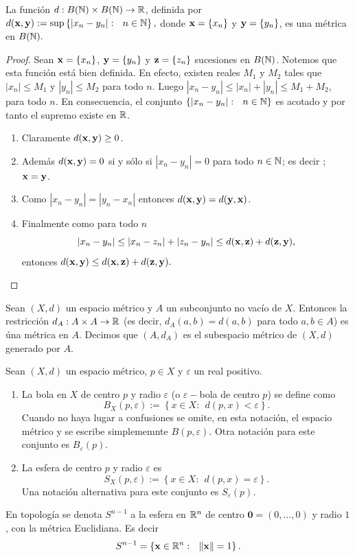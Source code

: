 \begin{example}
La función $d:B(\mathbb{N})\times B(\mathbb{N}) \to \mathbb{R}$, definida por $d(\mathbf{x} , \mathbf{y}):=\sup\left\{ |x_n-y_n|: \ \ n\in \mathbb{N} \right\},$ donde $\mathbf{x}=\left\{x_n \right\}$ y $\mathbf{y}=\left\{y_n \right\}$, es una métrica en $B(\mathbb{N}).$
\end{example}
\begin{proof}
Sean $\mathbf{x}=\{x_n\}$, $\mathbf{y}=\{y_n\}$ y $\mathbf{z}=\{z_n\}$ sucesiones en $B(\mathbb{N})$. Notemos que esta función está bien definida. En efecto, existen reales $M_1$ y $M_2$ tales que  $|x_n|\leq M_1$ y $|y_n|\leq M_2$ para todo $n$. Luego $|x_n-y_n|\leq |x_n|+|y_n|\leq M_1+M_2$, para todo $n$. En consecuencia, el conjunto $\{|x_n-y_n|:\ \ n\in \N\}$ es acotado y por tanto el supremo existe en $\mathbb{R}$.
\begin{enumerate}
    \item Claramente $d(\mathbf{x}, \mathbf{y}) \geq 0$.  
    \item Además $d(\mathbf{x}, \mathbf{y})=0$ si y sólo si $|x_n-y_n|=0$ para todo $n\in \mathbb{N}$; es decir ; $\mathbf{x}=\mathbf{y}$.
    \item Como $|x_n-y_n|=|y_n-x_n|$ entonces $d(\mathbf{x}, \mathbf{y})=d(\mathbf{y}, \mathbf{x})$.  
    \item Finalmente como para todo $n$ \[|x_n-y_n|\leq |x_n-z_n|+|z_n-y_n|\leq d(\mathbf{x}, \mathbf{z})+ d(\mathbf{z},\mathbf{y}),\]
    entonces $ d(\mathbf{x}, \mathbf{y})\leq d(\mathbf{x}, \mathbf{z})+ d(\mathbf{z},\mathbf{y}).$
\end{enumerate}
\end{proof}

\begin{remark}
Sean $(X,d)$ un espacio métrico y $A$ un subconjunto no vacío de $X$. Entonces la restricción \linebreak $d_A:A\times A \to \mathbb{R}$ (es decir, $d_A(a,b)=d(a,b)$ para todo $a,b\in A$) es úna métrica en $A$. Decimos que $(A, d_A)$ es el subespacio métrico de $(X,d)$ generado por $A$.
\end{remark}


\begin{definicion}
    Sean $(X,d)$ un espacio métrico, $p\in X$ y $\varepsilon$ un real positivo.
    \begin{enumerate}
        \item La bola en $X$ de centro $p$ y radio $\varepsilon$ (o $\varepsilon-$bola de centro $p$) se define como
    \[B_X(p,\varepsilon):=\left\{x\in X:\ \ d(p,x)<\varepsilon \right\}.\]
    Cuando no haya lugar a confusiones se omite, en esta notación, el espacio métrico y se escribe simplememnte $B(p, \varepsilon)$. Otra notación para este conjunto es $B_\varepsilon (p)$.
    \item La esfera de centro $p$ y radio $\varepsilon$ es
    \[S_X(p,\varepsilon):=\left\{x\in X:\ \ d(p,x)=\varepsilon \right\}.\]
    Una notación alternativa para este conjunto es $S_\varepsilon (p)$.
    \end{enumerate}
    \end{definicion}
    \begin{remark}
    En topología se denota $S^{n-1}$ a la esfera en $\mathbb{R}^{n}$ de centro $\textbf{0}=(0,\dots, 0)$ y radio $1$, con la métrica Euclidiana. Es decir
    \[S^{n-1}=\left\{\mathbf{x}\in \mathbb{R}^n:\ \ \|\mathbf{x}\|=1 \right\}.\]
    \end{remark}
   
